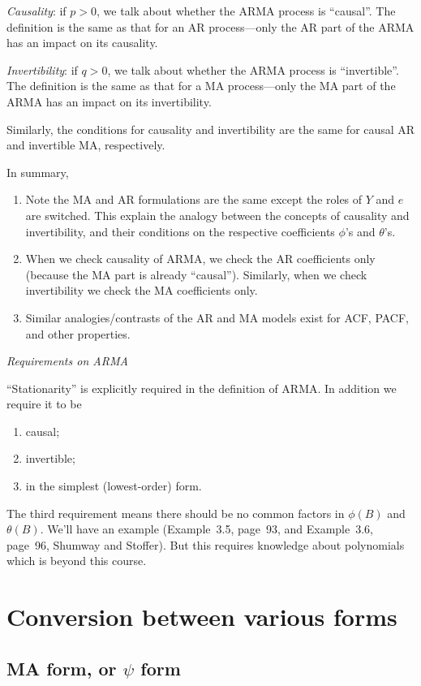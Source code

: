 \documentclass[12pt]{article}
\begin{document}
\emph{Causality}:
if $p > 0$, we talk about whether the ARMA process is ``causal''.
The definition is the same as that for an AR process---only
the AR part of the ARMA has an impact on its causality.

\emph{Invertibility}:
if $q > 0$, we talk about whether the ARMA process is ``invertible''.
The definition is the same as that for a  MA process---only
the MA part of the ARMA has an impact on its invertibility.

Similarly,
the conditions for causality and invertibility
are the same for causal AR and invertible MA,
respectively.

In summary,
\begin{enumerate}
\item
Note the MA and AR formulations are the same except the roles
of $Y$ and $e$ are switched. This explain the analogy
between the concepts of causality and invertibility, and their
conditions on the respective coefficients $\phi$'s and $\theta$'s.
\item
When we check causality of ARMA, we check the AR coefficients only
(because the MA part is already ``causal'').
Similarly, when we check invertibility we check the MA coefficients
only.
\item
Similar analogies/contrasts of the AR and MA models exist
for ACF, PACF, and other properties.
\end{enumerate}


\emph{Requirements on ARMA}

``Stationarity'' is explicitly required in the definition
of ARMA.
In addition we require it to be
\begin{enumerate}
\item causal;
\item invertible;
\item in the simplest (lowest-order) form.
\end{enumerate}

The third requirement means there should be no common factors in
$\phi(B)$ and $\theta(B)$.
We'll have an example
(Example~3.5, page~93, and
Example~3.6, page~96, Shumway and Stoffer).
But this requires knowledge about polynomials which is beyond this
course.


\section{Conversion between various forms}

\subsection{MA form, or $\psi$ form}
\end{document}
